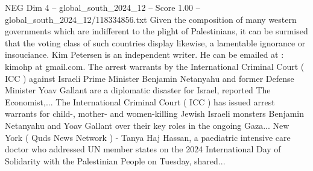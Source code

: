 \begin{textsample}{NEG Dim 4 – global\_south\_2024\_12 – Score 1.00 – global\_south\_2024\_12/118334856.txt}
Given the composition of many western governments which are indifferent to the plight of Palestinians, it can be surmised that the voting class of such countries display likewise, a lamentable ignorance or insouciance.
Kim Petersen is an independent writer.
He can be emailed at : kimohp at gmail.com.
The arrest warrants by the International Criminal Court ( ICC ) against Israeli Prime Minister Benjamin Netanyahu and former Defense Minister Yoav Gallant are a diplomatic disaster for Israel, reported The Economist,...
The International Criminal Court ( ICC ) has issued arrest warrants for child-, mother- and women-killing Jewish Israeli monsters Benjamin Netanyahu and Yoav Gallant over their key roles in the ongoing Gaza...
New York ( Quds News Network ) - Tanya Haj Hassan, a paediatric intensive care doctor who addressed UN member states on the 2024 International Day of Solidarity with the Palestinian People on Tuesday, shared...

\end{textsample}
